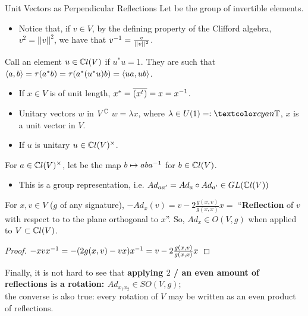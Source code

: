 \begin{frame}{Unit Vectors as Perpendicular Reflections} %
    Let  be the group of invertible elements.
        \begin{itemize}
            
        \item Notice that, if $v \in V$, by the defining property of the Clifford algebra, $v^2 = ||v||^2$, we have that $v^{-1} = \frac{v}{||v||^2}$.
            
        \end{itemize}
    
    Call an element $u \in \mathbb C l(V)$  if $u^* u = 1$. They are such that $\langle a, b \rangle = \tau(a^* b) = \tau(a^*(u^* u) b)  = \langle ua, ub \rangle$.
        \begin{itemize}
            
        \item If $x \in V$ is of unit length,  $x^* = \overline{(x^t)} = x = x^
        {-1}$.
        
        \item Unitary vectors $w$ in $V^\mathbb C$ \Iff $w = \lambda x$, where $\lambda \in U(1) =: \defn{\TT}$, $x$ is a unit vector in $V$.
        
        \item If $u$ is unitary \then $u \in \mathbb C l(V)^\times$.
            
        \end{itemize}
    

\end{frame}

\begin{frame} %

    For $a \in \mathbb C l(V)^\times$, let  be the map $b \mapsto a b a^{-1}$ for $b \in \mathbb C l(V)$. 
        \begin{itemize}
            
        \item This is a group representation, i.e. $Ad_{aa'} = Ad_a \circ Ad_{a'} \in GL(\mathbb C l(V))$ 
            
        \end{itemize}

    \begin{lemma}
    For $x, v \in V$ ($g$ of any signature), $-Ad_x(v) = v - 2 \frac{g(x, v)}{g(x, x)}x = $ ``\textbf{Reflection} of $v$ with respect to to the plane orthogonal to $x$''. So, $Ad_x \in O(V, g)$ when applied to $V\subset \mathbb C l(V)$.
    \end{lemma}
    \begin{proof} $-xvx^{-1} = -(2g(x, v) - v x)x^{-1} = v - 2 \frac{g(x, v)}{g(x, x)}x$
    \end{proof}
    
    Finally, it is not hard to see that \textbf{applying $2$ / an even amount of reflections is a rotation: $Ad_{x_1 x_2}\in SO(V, g)$}; \\the converse is also true: every rotation of $V$ may be written as an even product of reflections.
    
\end{frame}


